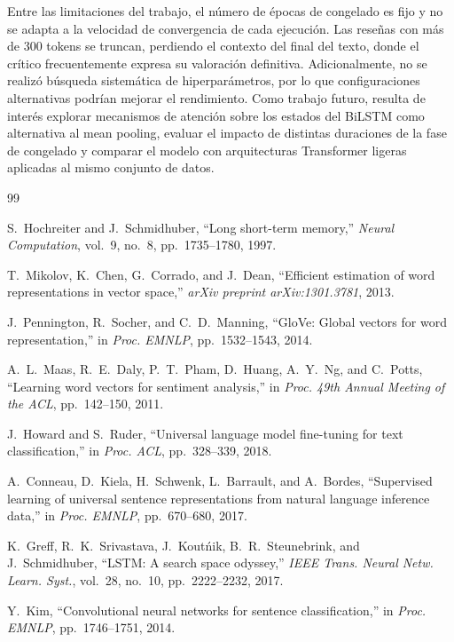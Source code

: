\documentclass[letterpaper, 10pt, conference]{ieeeconf}
\begin{document}
Entre las limitaciones del trabajo, el n\'umero de \'epocas de congelado es
fijo y no se adapta a la velocidad de convergencia de cada ejecuci\'on. Las
rese\~nas con m\'as de 300 tokens se truncan, perdiendo el contexto del final
del texto, donde el cr\'itico frecuentemente expresa su valoraci\'on definitiva.
Adicionalmente, no se realiz\'o b\'usqueda sistem\'atica de hiperpar\'ametros,
por lo que configuraciones alternativas podr\'ian mejorar el rendimiento. Como
trabajo futuro, resulta de inter\'es explorar mecanismos de atenci\'on sobre
los estados del BiLSTM como alternativa al mean pooling, evaluar el impacto de
distintas duraciones de la fase de congelado y comparar el modelo con
arquitecturas Transformer ligeras aplicadas al mismo conjunto de datos.

\clearpage

\begin{thebibliography}{99}

S.~Hochreiter and J.~Schmidhuber,
``Long short-term memory,''
\textit{Neural Computation}, vol.~9, no.~8, pp.~1735--1780, 1997.

T.~Mikolov, K.~Chen, G.~Corrado, and J.~Dean,
``Efficient estimation of word representations in vector space,''
\textit{arXiv preprint arXiv:1301.3781}, 2013.

J.~Pennington, R.~Socher, and C.~D.~Manning,
``GloVe: Global vectors for word representation,''
in \textit{Proc. EMNLP}, pp.~1532--1543, 2014.

A.~L.~Maas, R.~E.~Daly, P.~T.~Pham, D.~Huang, A.~Y.~Ng, and C.~Potts,
``Learning word vectors for sentiment analysis,''
in \textit{Proc. 49th Annual Meeting of the ACL}, pp.~142--150, 2011.

J.~Howard and S.~Ruder,
``Universal language model fine-tuning for text classification,''
in \textit{Proc. ACL}, pp.~328--339, 2018.

A.~Conneau, D.~Kiela, H.~Schwenk, L.~Barrault, and A.~Bordes,
``Supervised learning of universal sentence representations from natural
language inference data,''
in \textit{Proc. EMNLP}, pp.~670--680, 2017.

K.~Greff, R.~K.~Srivastava, J.~Kout\'nik, B.~R.~Steunebrink, and J.~Schmidhuber,
``LSTM: A search space odyssey,''
\textit{IEEE Trans. Neural Netw. Learn. Syst.}, vol.~28, no.~10,
pp.~2222--2232, 2017.

Y.~Kim,
``Convolutional neural networks for sentence classification,''
in \textit{Proc. EMNLP}, pp.~1746--1751, 2014.

\end{thebibliography}
\end{document}
